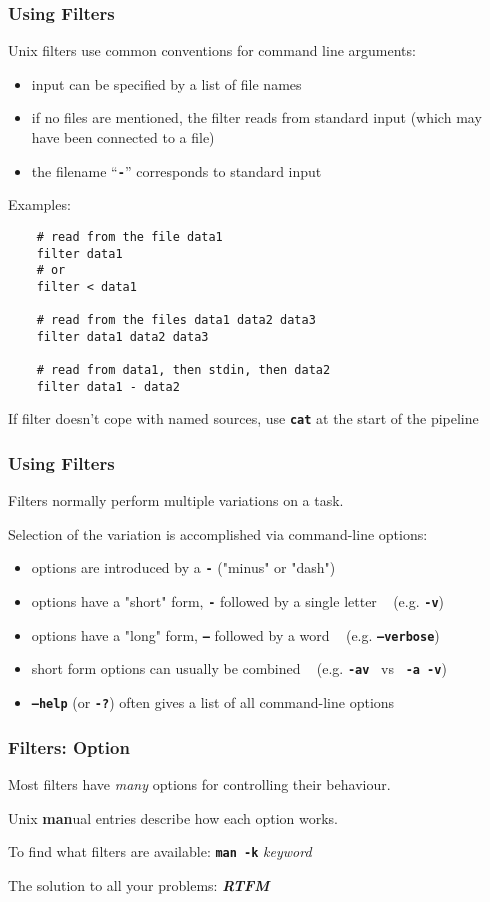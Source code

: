 \begin{frame}
\frametitle{Using Filters}
Unix filters use common conventions for command line arguments:
\begin{itemize}
\item  input can be specified by a list of file names
\item  if no files are mentioned, the filter reads from standard input
        {\small (which may have been connected to a file)}
\item  the filename ``{\bf{\textbf{\tt{-}}}}'' corresponds to standard input
\end{itemize}
Examples:
\begin{verbatim}
    # read from the file data1
    filter data1
    # or
    filter < data1
    
    # read from the files data1 data2 data3
    filter data1 data2 data3
    
    # read from data1, then stdin, then data2
    filter data1 - data2
\end{verbatim}

If filter doesn't cope with named sources, use \textbf{\tt{cat}}
at the start of the pipeline
\end{frame}

\begin{frame}[fragile]
\frametitle{Using Filters}
Filters normally perform multiple variations on a task.

Selection of the variation is accomplished via command-line options:
\begin{itemize}
\item  options are introduced by a {\bf{\textbf{\tt{-}}}} ("minus" or "dash")
\item  options have a "short" form, {\bf{\textbf{\tt{-}}}} followed by a single letter
        ~ {\small (e.g. \textbf{\tt{-v}})}
\item  options have a "long" form, {\bf{\textbf{\tt{--}}}} followed by a word
        ~ {\small (e.g. \textbf{\tt{--verbose}})}
\item  short form options can usually be combined
        ~ {\small (e.g. \textbf{\tt{-av}} ~{\small vs}~ \textbf{\tt{-a -v}})}
\item  \textbf{\tt{--help}} (or \textbf{\tt{-?}}) often gives a list of all command-line options
\end{itemize}
\end{frame}

\begin{frame}
\frametitle{Filters: Option}

Most filters have {\it{many}} options for controlling their behaviour.

Unix {\bf{man}}ual entries describe how each option works.

To find what filters are available: \textbf{\tt{man -k}} {\it{keyword}}

The solution to all your problems: {\em{{\bf{RTFM}}}}
\end{frame}

